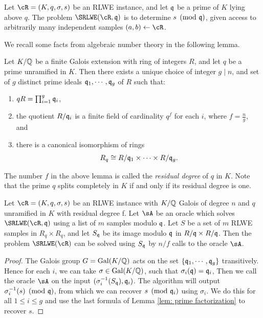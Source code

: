 \documentclass{amsart}
\begin{document}

\begin{Definition} \label{def: srlwe mod q}
        Let $\cR = (K,q,\sigma, s)$ be an RLWE instance, and let $\mathfrak{q}$ be a prime of $K$ lying above $q$.  The problem $\SRLWE(\cR, \fq)$ is to determine $s \pmod {\mathfrak{q}}$, given access to arbitrarily many independent samples $(a,b) \gets \cR$.
\end{Definition}

We recall some facts from algebraic number theory in the following lemma.
\begin{Lemma}
\label{lem: prime factorization}
Let $K/\mathbb{Q}$ be a finite Galois extension with ring of integers $R$,  and let $q$ be a prime unramified in $K$. Then there exists a unique choice of integer $g \mid n$, and set of $g$ distinct prime ideals $\mathfrak{q}_1, \cdots ,\mathfrak{q}_g$ of
$R$ such that:
\begin{enumerate}
        \item $qR = \prod_{i=1}^g \mathfrak{q}_i$,
        \item the quotient $R/\mathfrak{q}_{i}$ is a finite field of cardinality $q^f$  for each $i$, where $f = \frac{n}{g}$, and 
        \item there is a canonical isomorphism of rings
\[
    R_q \cong R/\mathfrak{q}_{1} \times \cdots \times R/\mathfrak{q}_{g}.
\]
\end{enumerate}
\end{Lemma}
The number $f$ in the above lemma is called the {\it residual degree} of $q$ in $K$. Note that the prime $q$ splits completely in $K$ if and only if its residual degree is one.


\begin{theorem} \label{thm: reduction}
        Let $\cR = (K,q,\sigma, s)$ be an RLWE instance with $K/\mathbb{Q}$ Galois of degree $n$ and $q$ unramified in $K$ with residual degree f. Let $\sA$ be an oracle which solves $\SRLWE(\cR,\fq)$ using a list of $m$ samples modulo $\mathfrak{q}$.  Let $S$ be a set of $m$ RLWE samples in $R_q \times R_q$, and let $S_{\mathfrak{q}}$ be its image modulo $\mathfrak{q}$ in $R/\mathfrak{q} \times R/\mathfrak{q}$.  Then the problem $\SRLWE(\cR)$ can be solved using $S_{\mathfrak{q}}$ by $n/f$ calls to the oracle $\sA$.
\end{theorem}

\begin{proof}
        The Galois group $G =\operatorname{Gal}(K/\mathbb{Q})$ acts on the set $\{\mathfrak{q}_1, \cdots ,\mathfrak{q}_g\}$ transitively. Hence for each $i$, we can take $\sigma \in \operatorname{Gal}(K/\mathbb{Q})$, such that $\sigma_i(\mathfrak{q}) = \mathfrak{q}_i$, Then we call the oracle $\sA$ on the input $(\sigma_i^{-1}(S_{\mathfrak{q}}), \mathfrak{q}_i)$. The algorithm will output $\sigma_i^{-1}(s) \pmod{\mathfrak{q}}$, from which we can recover $s \pmod{\mathfrak{q}_i}$ using $\sigma_i$.  We do this for all $1\leq i \leq g$ and use the last formula of Lemma \ref{lem: prime factorization} to recover $s$. 
\end{proof}
\end{document}
